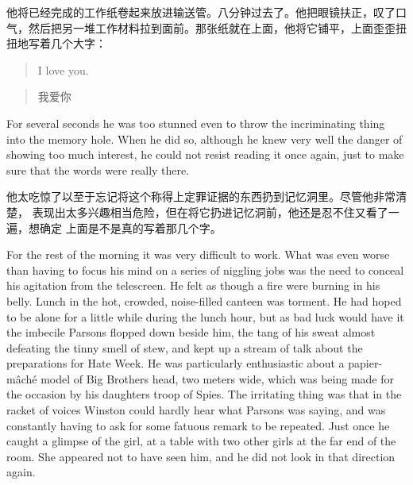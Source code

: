\begin{paracol}{2}
他将已经完成的工作纸卷起来放进输送管。八分钟过去了。他把眼镜扶正，叹了口气，然后把另一堆工作材料拉到面前。那张纸就在上面，他将它铺平，上面歪歪扭扭地写着几个大字：

\switchcolumn*

\begin{quotation}
I love you.
\end{quotation}

\switchcolumn

\begin{quotation}
我爱你
\end{quotation}

\switchcolumn*


For several seconds he was too stunned even to throw the incriminating
thing into the memory hole. When he did so, although he knew very well
the danger of showing too much interest, he could not resist reading it
once again, just to make sure that the words were really there.

\switchcolumn

他太吃惊了以至于忘记将这个称得上定罪证据的东西扔到记忆洞里。尽管他非常清楚，
表现出太多兴趣相当危险，但在将它扔进记忆洞前，他还是忍不住又看了一遍，想确定
上面是不是真的写着那几个字。

\switchcolumn*

For the rest of the morning it was very difficult to work. What was even
worse than having to focus his mind on a series of niggling jobs was the
need to conceal his agitation from the telescreen. He felt as though a
fire were burning in his belly. Lunch in the hot, crowded, noise-filled
canteen was torment. He had hoped to be alone for a little while during
the lunch hour, but as bad luck would have it the imbecile Parsons
flopped down beside him, the tang of his sweat almost defeating the
tinny smell of stew, and kept up a stream of talk about the preparations
for Hate Week. He was particularly enthusiastic about a papier-mâché
model of Big Brother\textquotesingle s head, two meters wide, which was
being made for the occasion by his daughter\textquotesingle s troop of
Spies. The irritating thing was that in the racket of voices Winston
could hardly hear what Parsons was saying, and was constantly having to
ask for some fatuous remark to be repeated. Just once he caught a
glimpse of the girl, at a table with two other girls at the far end of
the room. She appeared not to have seen him, and he did not look in that
direction again.

\switchcolumn


\end{paracol}

